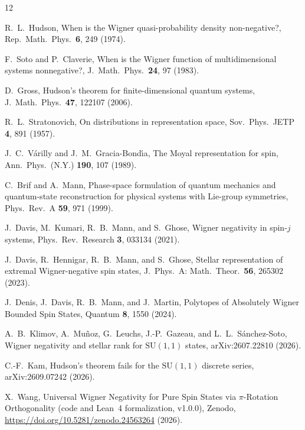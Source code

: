 \documentclass[aps,prl,reprint,amsmath,amssymb,nofootinbib,floatfix]{revtex4-2}
\begin{document}
\begin{thebibliography}{12}

R.~L.~Hudson, When is the Wigner quasi-probability density non-negative?, Rep.\ Math.\ Phys.\ \textbf{6}, 249 (1974).

F.~Soto and P.~Claverie, When is the Wigner function of multidimensional systems nonnegative?, J.\ Math.\ Phys.\ \textbf{24}, 97 (1983).

D.~Gross, Hudson's theorem for finite-dimensional quantum systems, J.\ Math.\ Phys.\ \textbf{47}, 122107 (2006).

R.~L.~Stratonovich, On distributions in representation space, Sov.\ Phys.\ JETP \textbf{4}, 891 (1957).

J.~C.~V\'arilly and J.~M.~Gracia-Bond\'{\i}a, The Moyal representation for spin, Ann.\ Phys.\ (N.Y.) \textbf{190}, 107 (1989).

C.~Brif and A.~Mann, Phase-space formulation of quantum mechanics and quantum-state reconstruction for physical systems with Lie-group symmetries, Phys.\ Rev.\ A \textbf{59}, 971 (1999).

J.~Davis, M.~Kumari, R.~B.~Mann, and S.~Ghose, Wigner negativity in spin-$j$ systems, Phys.\ Rev.\ Research \textbf{3}, 033134 (2021).

J.~Davis, R.~Hennigar, R.~B.~Mann, and S.~Ghose, Stellar representation of extremal Wigner-negative spin states, J.\ Phys.\ A: Math.\ Theor.\ \textbf{56}, 265302 (2023).

J.~Denis, J.~Davis, R.~B.~Mann, and J.~Martin, Polytopes of Absolutely Wigner Bounded Spin States, Quantum \textbf{8}, 1550 (2024).

A.~B.~Klimov, A.~Mu\~noz, G.~Leuchs, J.-P.~Gazeau, and L.~L.~S\'anchez-Soto, Wigner negativity and stellar rank for $\mathrm{SU}(1,1)$ states, arXiv:2607.22810 (2026).

C.-F.~Kam, Hudson's theorem fails for the $\mathrm{SU}(1,1)$ discrete series, arXiv:2609.07242 (2026).

X.~Wang, Universal Wigner Negativity for Pure Spin States via $\pi$-Rotation Orthogonality (code and Lean~4 formalization, v1.0.0), Zenodo, \url{https://doi.org/10.5281/zenodo.24563264} (2026).

\end{thebibliography}
\end{document}
